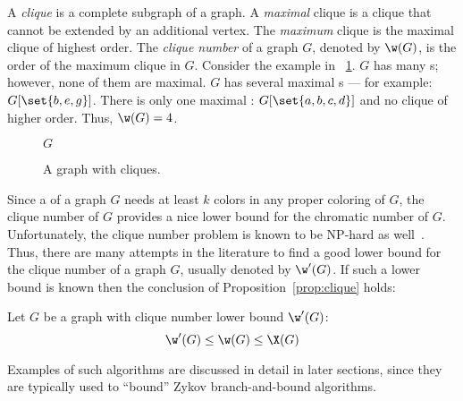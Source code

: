 A \emph{clique} is a complete subgraph of a graph.  A \emph{maximal} clique is a clique that cannot be extended by
an additional vertex.  The \emph{maximum} clique is the maximal clique of highest order.  The \emph{clique number}
of a graph \(G\), denoted by \(\w(G)\), is the order of the maximum clique in \(G\).  Consider the example in
\figurename~\ref{fig:clique}.  \(G\) has many s; however, none of them are maximal.  \(G\) has several
maximal s --- for example: \(G[\set{b,e,g}]\).  There is only one maximal :
\(G[\set{a,b,c,d}]\) and no clique of higher order.  Thus, \(\w(G)=4\).

\begin{figure}[H]
  \centering

  \bigskip

  \(G\)
  \caption{A graph with cliques.}
  \label{fig:clique}
\end{figure}

Since a  of a graph \(G\) needs at least \(k\) colors in any proper coloring of \(G\), the clique number
of \(G\) provides a nice lower bound for the chromatic number of \(G\).  Unfortunately, the clique number problem
is known to be NP-hard as well~\cite{corneil}.  Thus, there are many attempts in the literature to find a good
lower bound for the clique number of a graph \(G\), usually denoted by \(\w'(G)\).  If such a lower bound is known
then the conclusion of Proposition~\ref{prop:clique} holds:

\begin{proposition}
  \label{prop:clique}
  Let \(G\) be a graph with clique number lower bound \(\w'(G)\):
  \[\w'(G)\le\w(G)\le\X(G)\]
\end{proposition}

Examples of such algorithms are discussed in detail in later sections, since they are typically used to ``bound''
Zykov branch-and-bound algorithms.
